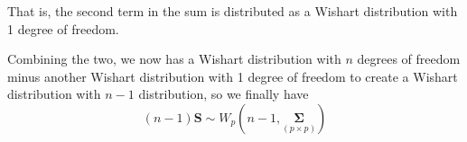\documentclass{article}
\begin{document}
    That is, the second term in the sum is distributed as a Wishart distribution with 1 degree of freedom.

    Combining the two, we now has a Wishart distribution with $n$ degrees of freedom minus another Wishart distribution with 1 degree of freedom to create a Wishart distribution with $n - 1$ distribution, so we finally have
    \[
        (n-1)\textbf{S}
        \sim
        W_{p}\left(n-1, \underset{(p \times p)}{\bm{\Sigma}}\right)
    \]
\end{document}
